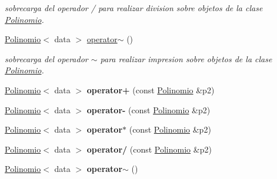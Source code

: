 \begin{DoxyCompactItemize}
\begin{DoxyCompactList}\small\item\em sobrecarga del operador / para realizar division sobre objetos de la clase \hyperlink{classPolinomio}{Polinomio}. \end{DoxyCompactList}\item 
\hypertarget{classPolinomio_ab6e75c2e0d601a075b7d4b4895dfa3d2}{\hyperlink{classPolinomio}{Polinomio}$<$ data $>$ \hyperlink{classPolinomio_ab6e75c2e0d601a075b7d4b4895dfa3d2}{operator$\sim$} ()}\label{classPolinomio_ab6e75c2e0d601a075b7d4b4895dfa3d2}

\begin{DoxyCompactList}\small\item\em sobrecarga del operador $\sim$ para realizar impresion sobre objetos de la clase \hyperlink{classPolinomio}{Polinomio}. \end{DoxyCompactList}\item 
\hypertarget{classPolinomio_a041c61f9e826c7314897eb79e7093608}{\hyperlink{classPolinomio}{Polinomio}$<$ data $>$ {\bfseries operator+} (const \hyperlink{classPolinomio}{Polinomio} \&p2)}\label{classPolinomio_a041c61f9e826c7314897eb79e7093608}

\item 
\hypertarget{classPolinomio_a8d588b6a6599e51b43fe8d862b8a101a}{\hyperlink{classPolinomio}{Polinomio}$<$ data $>$ {\bfseries operator-\/} (const \hyperlink{classPolinomio}{Polinomio} \&p2)}\label{classPolinomio_a8d588b6a6599e51b43fe8d862b8a101a}

\item 
\hypertarget{classPolinomio_ad75c542c6f6010e984e26db1a5dcede4}{\hyperlink{classPolinomio}{Polinomio}$<$ data $>$ {\bfseries operator$\ast$} (const \hyperlink{classPolinomio}{Polinomio} \&p2)}\label{classPolinomio_ad75c542c6f6010e984e26db1a5dcede4}

\item 
\hypertarget{classPolinomio_a7cd2086e477c15518ca03385f9a341da}{\hyperlink{classPolinomio}{Polinomio}$<$ data $>$ {\bfseries operator/} (const \hyperlink{classPolinomio}{Polinomio} \&p2)}\label{classPolinomio_a7cd2086e477c15518ca03385f9a341da}

\item 
\hypertarget{classPolinomio_a2ae9f3af6fa162c2dc1e2970fa58c71a}{\hyperlink{classPolinomio}{Polinomio}$<$ data $>$ {\bfseries operator$\sim$} ()}\label{classPolinomio_a2ae9f3af6fa162c2dc1e2970fa58c71a}

\end{DoxyCompactItemize}
